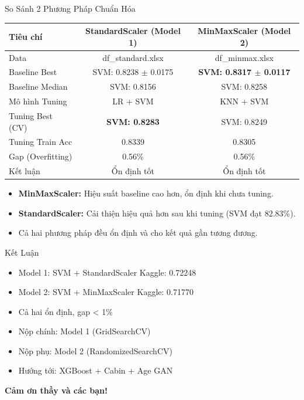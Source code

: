 \documentclass[
	11pt
]{beamer}
\begin{document}
\begin{frame}{So Sánh 2 Phương Pháp Chuẩn Hóa}
	
	\centering
	\small
	\begin{tabular}{lcc}
		\toprule
		\textbf{Tiêu chí} & \textbf{StandardScaler (Model 1)} & \textbf{MinMaxScaler (Model 2)} \\
		\midrule
		Data & df\_standard.xlsx & df\_minmax.xlsx \\
		Baseline Best & SVM: 0.8238 $\pm$ 0.0175 & \textbf{SVM: 0.8317 $\pm$ 0.0117} \\
		Baseline Median & SVM: 0.8156 & SVM: 0.8258 \\
		Mô hình Tuning & LR + SVM & KNN + SVM \\
		Tuning Best (CV) & \textbf{SVM: 0.8283} & SVM: 0.8249 \\
		Tuning Train Acc & 0.8339 & 0.8305 \\
		Gap (Overfitting) & 0.56\% & 0.56\% \\
		Kết luận &  Ổn định tốt &  Ổn định tốt \\
		\bottomrule 
	\end{tabular}
	
	\vspace{0.6em}
	
	\begin{itemize}
		\item \textbf{MinMaxScaler:} Hiệu suất baseline cao hơn, ổn định khi chưa tuning.
		\item \textbf{StandardScaler:} Cải thiện hiệu quả hơn sau khi tuning (SVM đạt 82.83\%).
		\item Cả hai phương pháp đều ổn định và cho kết quả gần tương đương.
	\end{itemize}
	
\end{frame}

	
\begin{frame}{Kết Luận }
	\begin{itemize}
		\item Model 1: SVM + StandardScaler \quad \alert{Kaggle: 0.72248}
		\item Model 2: SVM + MinMaxScaler   \quad \alert{Kaggle: 0.71770}
		\item Cả hai ổn định, gap < 1\%
		\item Nộp chính: Model 1 (GridSearchCV)
		\item Nộp phụ:   Model 2 (RandomizedSearchCV)
		\item Hướng tới: XGBoost + Cabin + Age GAN
	\end{itemize}
\end{frame}










\begin{frame}
\centering
\Huge \textbf{Cảm ơn thầy và các bạn!}
\end{frame}
\end{document}
